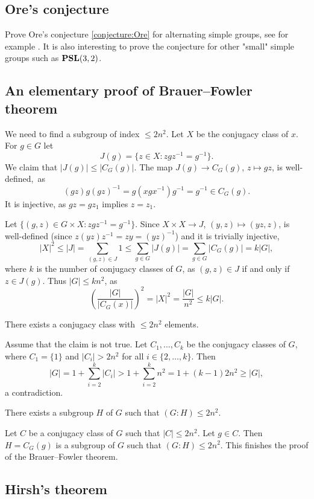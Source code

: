 \subsection*{Ore's conjecture}

Prove Ore's conjecture \ref{conjecture:Ore} for alternating simple groups,
see for example \cite{MR40298}. It is also interesting to prove the conjecture
for other "small" simple groups such as $\mathbf{PSL}(3,2)$.  

\subsection*{An elementary proof of Brauer--Fowler theorem}

We need to find a subgroup of index $\leq 2n^2$. 
Let $X$ be the conjugacy class of $x$. For $g\in G$ let
\[
J(g)=\{z\in X:zgz^{-1}=g^{-1}\}.
\]
We claim that $|J(g)|\leq|C_G(g)|$. The map $J(g)\to C_G(g)$, $z\mapsto gz$, 
is well-defined,~as 
\[
(gz)g(gz)^{-1}=g(xgx^{-1})g^{-1}=g^{-1}\in C_G(g).
\]
It is injective, as $gz=gz_1$ implies $z=z_1$.

Let $\{(g,z)\in G\times X:zgz^{-1}=g^{-1}\}$.  
Since $X\times X\to J$, $(y,z)\mapsto (yz,z)$, 
is well-defined (since $z(yz)z^{-1}=zy=(yz)^{-1}$) and
it is trivially injective, 
\[
|X|^2\leq |J|=\sum_{(g,z)\in J}1\leq\sum_{g\in G}|J(g)|
=\sum_{g\in G}|C_G(g)|=k|G|,
\]
where $k$ is the number of conjugacy classes of $G$, 
as $(g,z)\in J$ if and only if $z\in J(g)$. Thus $|G|\leq kn^2$, as
\[
\left(\frac{|G|}{|C_G(x)|}\right)^2=|X|^2=\frac{|G|}{n^2}\leq k|G|.
\]

\begin{claim}
    There exists a conjugacy class with $\leq 2n^2$ elements.
\end{claim}

Assume that the claim is not true. Let
$C_1,\dots,C_k$ be the conjugacy classes of $G$, where 
$C_1=\{1\}$ and $|C_i|>2n^2$ for all $i\in\{2,\dots,k\}$. Then
\[
|G|=1+\sum_{i=2}^k|C_i|>1+\sum_{i=2}^kn^2=1+(k-1)2n^2\geq |G|,
\]
a contradiction. 

\begin{claim}
    There exists a subgroup $H$ of $G$ such that
    $(G:H)\leq 2n^2$.
\end{claim}

Let $C$ be a conjugacy class of $G$ such that 
$|C|\leq 2n^2$. Let $g\in C$.  
Then $H=C_G(g)$ is a subgroup of $G$ such that
$(G:H)\leq 2n^2$. 
This finishes the proof of the Brauer--Fowler theorem. 


\subsection*{Hirsh's theorem}


